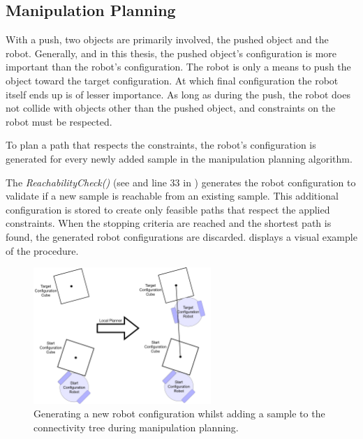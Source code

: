 \subsection{Manipulation Planning}%
\label{subsec:manipulation_planning}
With a push, two objects are primarily involved, the pushed object and the robot. Generally, and in this thesis, the pushed object's configuration is more important than the robot's configuration. The robot is only a means to push the object toward the target configuration. At which final configuration the robot itself ends up is of lesser importance. As long as during the push, the robot does not collide with objects other than the pushed object, and constraints on the robot must be respected.\bs

To plan a path that respects the constraints,  the robot's configuration is generated for every newly added sample in the manipulation planning algorithm. 

The \textit{ReachabilityCheck()} (see  and line 33 in ) generates the robot configuration to validate if a new sample is reachable from an existing sample. This additional configuration is stored to create only feasible paths that respect the applied constraints. When the stopping criteria are reached and the shortest path is found, the generated robot configurations are discarded.  displays a visual example of the procedure.\bs

\begin{figure}[H]
    \centering
    \includegraphics[width=0.6\textwidth]{figures/required_background/manipulation_local_planner}
    \caption{Generating a new robot configuration whilst adding a sample to the connectivity tree during manipulation planning.}%
    \label{fig:manipulation_plannig_local_planner}
\end{figure}

